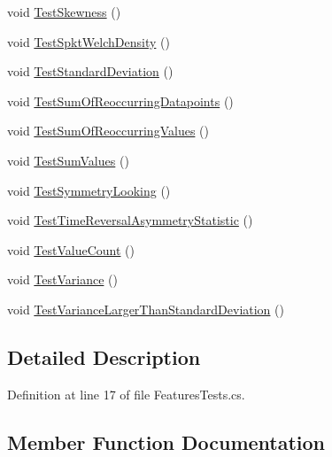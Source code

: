 \begin{DoxyCompactItemize}
\item 
void \mbox{\hyperlink{classkhiva_1_1features_1_1tests_1_1_features_tests_a7c86e7abadc21f9e45a52352732c5dc3}{Test\+Skewness}} ()
\item 
void \mbox{\hyperlink{classkhiva_1_1features_1_1tests_1_1_features_tests_ab88fbe6a884ee0fff5babddde7e19648}{Test\+Spkt\+Welch\+Density}} ()
\item 
void \mbox{\hyperlink{classkhiva_1_1features_1_1tests_1_1_features_tests_a5b350b97d87ed8501afeeb3a3228159d}{Test\+Standard\+Deviation}} ()
\item 
void \mbox{\hyperlink{classkhiva_1_1features_1_1tests_1_1_features_tests_a2bbbf32002f6913ace3f5569676d5c46}{Test\+Sum\+Of\+Reoccurring\+Datapoints}} ()
\item 
void \mbox{\hyperlink{classkhiva_1_1features_1_1tests_1_1_features_tests_a17480c44436ffe3905a6aa252a0bc4c9}{Test\+Sum\+Of\+Reoccurring\+Values}} ()
\item 
void \mbox{\hyperlink{classkhiva_1_1features_1_1tests_1_1_features_tests_aaef5ed1c6afc2e0140e76e145460d843}{Test\+Sum\+Values}} ()
\item 
void \mbox{\hyperlink{classkhiva_1_1features_1_1tests_1_1_features_tests_a84cae4fe630035d7cbdd134f660ff743}{Test\+Symmetry\+Looking}} ()
\item 
void \mbox{\hyperlink{classkhiva_1_1features_1_1tests_1_1_features_tests_a0793b143de56a8c8460868840b707fcf}{Test\+Time\+Reversal\+Asymmetry\+Statistic}} ()
\item 
void \mbox{\hyperlink{classkhiva_1_1features_1_1tests_1_1_features_tests_a27efa6d100a230d764f15a03620d958e}{Test\+Value\+Count}} ()
\item 
void \mbox{\hyperlink{classkhiva_1_1features_1_1tests_1_1_features_tests_af12b2dce1b8487ce0a26171e582818ba}{Test\+Variance}} ()
\item 
void \mbox{\hyperlink{classkhiva_1_1features_1_1tests_1_1_features_tests_abb9c797cffedf7be9d80b7f2f66fad39}{Test\+Variance\+Larger\+Than\+Standard\+Deviation}} ()
\end{DoxyCompactItemize}


\subsection{Detailed Description}


Definition at line 17 of file Features\+Tests.\+cs.



\subsection{Member Function Documentation}
\mbox{\label{classkhiva_1_1features_1_1tests_1_1_features_tests_ab66ad8e9e59d29de45c9ce95031cb5b3}} 

